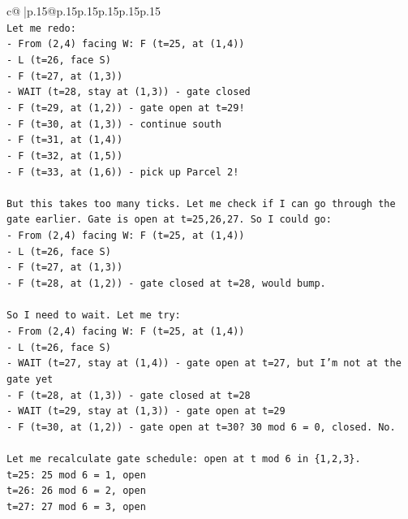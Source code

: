 \documentclass{article}
\begin{document}
{\begin{supertabular}{c@{$\;$}|p{.15\linewidth}@{}p{.15\linewidth}p{.15\linewidth}p{.15\linewidth}p{.15\linewidth}p{.15\linewidth}}
{{{\\ 
\texttt{Let me redo:} \\
\texttt{{-} From (2,4) facing W: F (t=25, at (1,4))} \\
\texttt{{-} L (t=26, face S)} \\
\texttt{{-} F (t=27, at (1,3))} \\
\texttt{{-} WAIT (t=28, stay at (1,3)) {-} gate closed} \\
\texttt{{-} F (t=29, at (1,2)) {-} gate open at t=29!} \\
\texttt{{-} F (t=30, at (1,3)) {-} continue south} \\
\texttt{{-} F (t=31, at (1,4))} \\
\texttt{{-} F (t=32, at (1,5))} \\
\texttt{{-} F (t=33, at (1,6)) {-} pick up Parcel 2!} \\
\\ 
\texttt{But this takes too many ticks. Let me check if I can go through the gate earlier. Gate is open at t=25,26,27. So I could go:} \\
\texttt{{-} From (2,4) facing W: F (t=25, at (1,4))} \\
\texttt{{-} L (t=26, face S)} \\
\texttt{{-} F (t=27, at (1,3))} \\
\texttt{{-} F (t=28, at (1,2)) {-} gate closed at t=28, would bump.} \\
\\ 
\texttt{So I need to wait. Let me try:} \\
\texttt{{-} From (2,4) facing W: F (t=25, at (1,4))} \\
\texttt{{-} L (t=26, face S)} \\
\texttt{{-} WAIT (t=27, stay at (1,4)) {-} gate open at t=27, but I'm not at the gate yet} \\
\texttt{{-} F (t=28, at (1,3)) {-} gate closed at t=28} \\
\texttt{{-} WAIT (t=29, stay at (1,3)) {-} gate open at t=29} \\
\texttt{{-} F (t=30, at (1,2)) {-} gate open at t=30? 30 mod 6 = 0, closed. No.} \\
\\ 
\texttt{Let me recalculate gate schedule: open at t mod 6 in \{1,2,3\}.} \\
\texttt{t=25: 25 mod 6 = 1, open} \\
\texttt{t=26: 26 mod 6 = 2, open} \\
\texttt{t=27: 27 mod 6 = 3, open} \\
}}}
\end{supertabular}}
\end{document}
